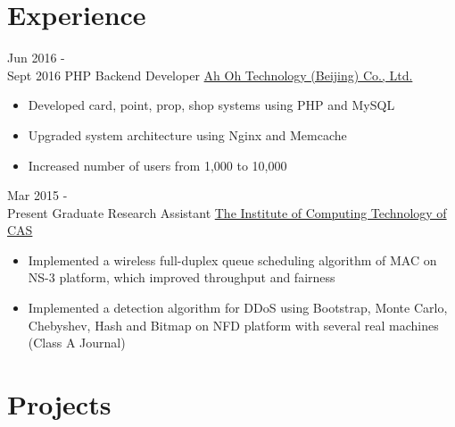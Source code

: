 \documentclass[letterpaper]{twentysecondcv} %
\begin{document}
\makeprofile %



\section{Experience}

\begin{twenty} %
	\twentyitem
    	{Jun 2016 - \\Sept 2016}
        {PHP Backend Developer}
        {\href{http://www.runorout.cn/}{Ah Oh Technology (Beijing) Co., Ltd.}}
        {}
        {
        {\begin{itemize}
        \item Developed card, point, prop, shop systems using PHP and MySQL
        \item Upgraded system architecture using Nginx and Memcache
        \item Increased number of users from 1,000 to 10,000
    \end{itemize}}
        }
    
    \twentyitem
	    {Mar 2015 - \\Present}
	    {Graduate Research Assistant}
	    {\href{http://english.ict.cas.cn/}{ The Institute of Computing Technology of CAS}}
	    {}
	    {
    	{\begin{itemize}
    			\item Implemented a wireless full-duplex queue scheduling algorithm of MAC on NS-3 platform, which improved throughput and fairness
    			\item Implemented a detection algorithm for DDoS using Bootstrap, Monte Carlo, Chebyshev, Hash and Bitmap on NFD platform with several real machines (Class A Journal)
    	\end{itemize}}
    }
        
\end{twenty}


\section{Projects}
\end{document}
